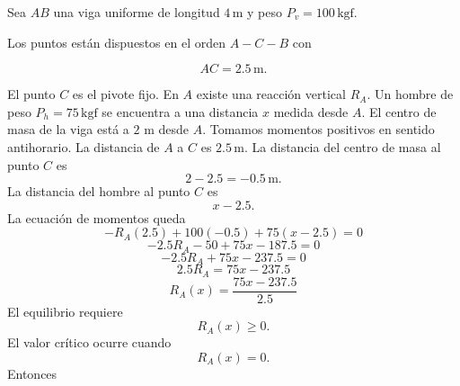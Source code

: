 \documentclass[12pt,a4paper]{article}
\begin{document}
    \begin{solucion}
        Sea $AB$ una viga uniforme de longitud $4\,\text{m}$ y peso 
        $P_v=100\,\text{kgf}$.  

        Los puntos están dispuestos en el orden $A-C-B$ con

        \begin{equation*}
            AC = 2.5\,\text{m}.
        \end{equation*}

        El punto $C$ es el pivote fijo.
        En $A$ existe una reacción vertical $R_A$.
        Un hombre de peso $P_h=75\,\text{kgf}$ se encuentra a una distancia $x$
        medida desde $A$. El centro de masa de la viga está a $2\text{ m}$
        desde $A$. Tomamos momentos positivos en sentido antihorario.
        La distancia de $A$ a $C$ es $2.5\,\text{m}$. La distancia del centro de masa al punto $C$ es
        \begin{equation*}
            2 - 2.5 = -0.5\,\text{m}.
        \end{equation*}
        La distancia del hombre al punto $C$ es
        \begin{equation*}
            x - 2.5.
        \end{equation*}
        La ecuación de momentos queda
        \begin{equation*}
            - R_A(2.5) + 100(-0.5) + 75(x-2.5) = 0
        \end{equation*}
        \begin{equation*}
            -2.5R_A -50 + 75x -187.5 = 0
        \end{equation*}
        \begin{equation*}
            -2.5R_A + 75x -237.5 = 0
        \end{equation*}
        \begin{equation*}
            2.5R_A = 75x -237.5
        \end{equation*}
        \begin{equation*}
            R_A(x) = \frac{75x -237.5}{2.5}
        \end{equation*}
        El equilibrio requiere
        \begin{equation*}
            R_A(x) \ge 0.
        \end{equation*}
        El valor crítico ocurre cuando
        \begin{equation*}
            R_A(x)=0.
        \end{equation*}
        Entonces
        \begin{equation*}

\end{equation*}
\end{solucion}
\end{document}
